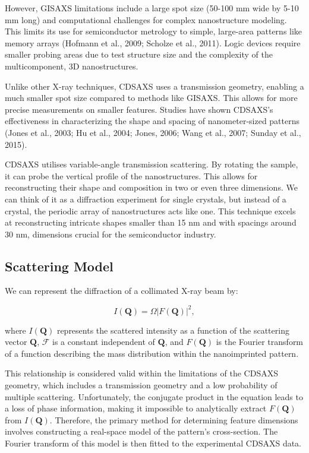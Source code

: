 However, GISAXS limitations include a large spot size (50-100 mm wide by 5-10 mm long) and
computational challenges for complex nanostructure modeling. This limits its use for 
semiconductor metrology to simple, large-area patterns like memory arrays (Hofmann et al.,
2009; Scholze et al., 2011). Logic devices require smaller probing areas due to test structure 
size and the complexity of the multicomponent, 3D nanostructures.

\medskip

Unlike other X-ray techniques, CDSAXS uses a transmission geometry, enabling a much smaller
spot size compared to methods like GISAXS. This allows for more precise measurements on smaller
features. Studies have shown CDSAXS's effectiveness in characterizing the shape and spacing of
nanometer-sized patterns (Jones et al., 2003; Hu et al., 2004; Jones, 2006; Wang et al., 2007; Sunday et al., 2015).

\medskip
CDSAXS  utilises variable-angle transmission scattering. By rotating the sample, it can probe the vertical profile of the nanostructures. This allows 
for reconstructing their shape and composition in two or even three dimensions.
We can think of it as a diffraction experiment for single crystals, but instead of a crystal, the 
periodic array of nanostructures acts like one. This technique excels at reconstructing 
intricate shapes smaller than 15 nm and with spacings around 30 nm, dimensions crucial for 
the semiconductor industry.

\subsection{Scattering Model}

\medskip
We can represent the diffraction of a collimated X-ray beam by:

\begin{equation}
    I(\mathbf{Q}) = \varOmega | F(\mathbf{Q}) |^2,
\end{equation}
    
where $I(\mathbf{Q})$ represents the scattered intensity as a function of the scattering
vector $\mathbf{Q}$, $\mathcal{F}$ is a constant independent of $\mathbf{Q}$,
and $F(\mathbf{Q})$ is the Fourier transform of a function describing the mass
distribution within the nanoimprinted pattern. 
    
This relationship is considered valid within the limitations of the CDSAXS geometry,
which includes a transmission geometry and a low probability of multiple scattering.    
Unfortunately, the conjugate product in the equation leads to a loss of phase
information, making it impossible to analytically extract $F(\mathbf{Q})$ from $I(\mathbf{Q})$.
Therefore, the primary method for determining feature dimensions involves constructing
a real-space model of the pattern's cross-section. The Fourier transform of this 
model is then fitted to the experimental CDSAXS data.

